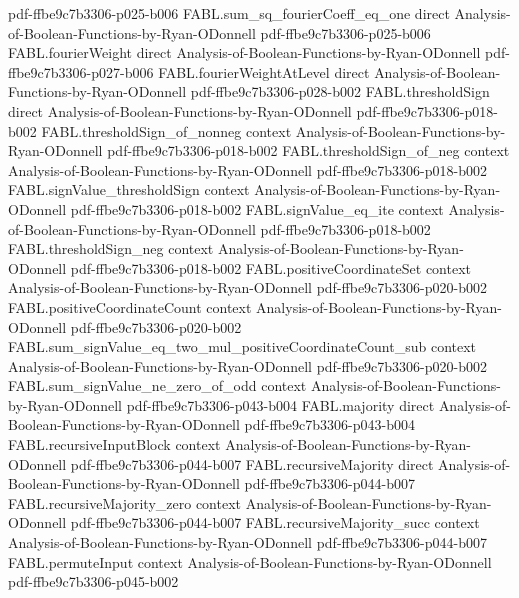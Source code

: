 \begin{theorem}
  {pdf-ffbe9c7b3306-p025-b006}
\proofstep
  {FABL.sum_sq_fourierCoeff_eq_one}
  {direct}
  {Analysis-of-Boolean-Functions-by-Ryan-ODonnell}
  {pdf-ffbe9c7b3306-p025-b006}
\proofstep
  {FABL.fourierWeight}
  {direct}
  {Analysis-of-Boolean-Functions-by-Ryan-ODonnell}
  {pdf-ffbe9c7b3306-p027-b006}
\proofstep
  {FABL.fourierWeightAtLevel}
  {direct}
  {Analysis-of-Boolean-Functions-by-Ryan-ODonnell}
  {pdf-ffbe9c7b3306-p028-b002}
\proofstep
  {FABL.thresholdSign}
  {direct}
  {Analysis-of-Boolean-Functions-by-Ryan-ODonnell}
  {pdf-ffbe9c7b3306-p018-b002}
\proofstep
  {FABL.thresholdSign_of_nonneg}
  {context}
  {Analysis-of-Boolean-Functions-by-Ryan-ODonnell}
  {pdf-ffbe9c7b3306-p018-b002}
\proofstep
  {FABL.thresholdSign_of_neg}
  {context}
  {Analysis-of-Boolean-Functions-by-Ryan-ODonnell}
  {pdf-ffbe9c7b3306-p018-b002}
\proofstep
  {FABL.signValue_thresholdSign}
  {context}
  {Analysis-of-Boolean-Functions-by-Ryan-ODonnell}
  {pdf-ffbe9c7b3306-p018-b002}
\proofstep
  {FABL.signValue_eq_ite}
  {context}
  {Analysis-of-Boolean-Functions-by-Ryan-ODonnell}
  {pdf-ffbe9c7b3306-p018-b002}
\proofstep
  {FABL.thresholdSign_neg}
  {context}
  {Analysis-of-Boolean-Functions-by-Ryan-ODonnell}
  {pdf-ffbe9c7b3306-p018-b002}
\proofstep
  {FABL.positiveCoordinateSet}
  {context}
  {Analysis-of-Boolean-Functions-by-Ryan-ODonnell}
  {pdf-ffbe9c7b3306-p020-b002}
\proofstep
  {FABL.positiveCoordinateCount}
  {context}
  {Analysis-of-Boolean-Functions-by-Ryan-ODonnell}
  {pdf-ffbe9c7b3306-p020-b002}
\proofstep
  {FABL.sum_signValue_eq_two_mul_positiveCoordinateCount_sub}
  {context}
  {Analysis-of-Boolean-Functions-by-Ryan-ODonnell}
  {pdf-ffbe9c7b3306-p020-b002}
\proofstep
  {FABL.sum_signValue_ne_zero_of_odd}
  {context}
  {Analysis-of-Boolean-Functions-by-Ryan-ODonnell}
  {pdf-ffbe9c7b3306-p043-b004}
\proofstep
  {FABL.majority}
  {direct}
  {Analysis-of-Boolean-Functions-by-Ryan-ODonnell}
  {pdf-ffbe9c7b3306-p043-b004}
\proofstep
  {FABL.recursiveInputBlock}
  {context}
  {Analysis-of-Boolean-Functions-by-Ryan-ODonnell}
  {pdf-ffbe9c7b3306-p044-b007}
\proofstep
  {FABL.recursiveMajority}
  {direct}
  {Analysis-of-Boolean-Functions-by-Ryan-ODonnell}
  {pdf-ffbe9c7b3306-p044-b007}
\proofstep
  {FABL.recursiveMajority_zero}
  {context}
  {Analysis-of-Boolean-Functions-by-Ryan-ODonnell}
  {pdf-ffbe9c7b3306-p044-b007}
\proofstep
  {FABL.recursiveMajority_succ}
  {context}
  {Analysis-of-Boolean-Functions-by-Ryan-ODonnell}
  {pdf-ffbe9c7b3306-p044-b007}
\proofstep
  {FABL.permuteInput}
  {context}
  {Analysis-of-Boolean-Functions-by-Ryan-ODonnell}
  {pdf-ffbe9c7b3306-p045-b002}

\end{theorem}
